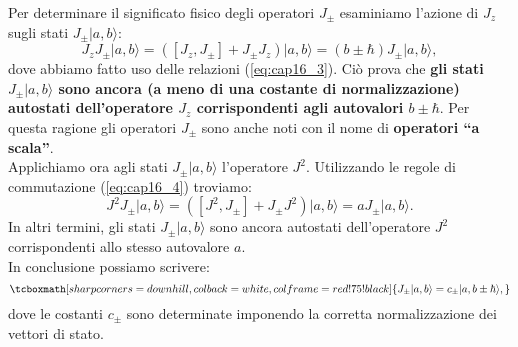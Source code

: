 \documentclass[a4paper,12pt,oneside]{book}
\begin{document}
Per determinare il significato fisico degli operatori $J_{\pm}$ esaminiamo l'azione di $J_z$ sugli stati $J_{\pm} \vert a, b \rangle$:
\begin{equation}
J_zJ_{\pm} \vert a, b \rangle =\left( [J_z,J_{\pm}] + J_{\pm}J_{z}\right)\vert a, b \rangle = (b \pm \hbar )J_{\pm} \vert a, b \rangle , 
\end{equation}
dove abbiamo fatto uso delle relazioni (\ref{eq:cap16_3}). Ciò prova che \textbf{gli stati $ J_{\pm} \vert a, b \rangle$ sono ancora (a meno di una costante di normalizzazione) autostati dell'operatore $J_z$ corrispondenti agli autovalori $b\pm \hbar$}. Per questa ragione gli operatori $J_{\pm}$ sono anche noti con il nome di \textbf{operatori ``a scala''}.\\

Applichiamo ora agli stati $ J_{\pm} \vert a, b \rangle$ l'operatore $J^2$. Utilizzando le regole di commutazione (\ref{eq:cap16_4}) troviamo:
	\begin{equation}
		J^2J_{\pm} \vert a, b \rangle = \left( [J^2,J_{\pm}] + J_{\pm}J^2\right)\vert a, b \rangle = a J_{\pm} \vert a, b \rangle .
	\end{equation}
In altri termini, gli stati $J_{\pm} \vert a, b \rangle$ sono ancora autostati dell'operatore $J^2$ corrispondenti allo stesso autovalore $a$.\\

In conclusione possiamo scrivere:
	\begin{equation}
		\tcboxmath[sharp corners=downhill, colback=white, colframe=red!75!black]{
			J_{\pm} \vert a, b \rangle = c_{\pm}\vert a, b\pm \hbar \rangle,
			}
	\label{eq:cap16_5}
	\end{equation}
dove le costanti $c_{\pm}$ sono determinate imponendo la corretta normalizzazione dei vettori di stato.\\
\end{document}
